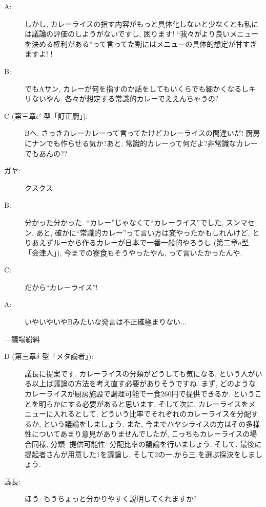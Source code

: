 \documentclass[10pt,b5jsbook,dvips,dvipdfmx,openany]{jsbook}
\theoremstyle{definition}
\begin{document}
\begin{multicols}{2}
\begin{description}
		\item[A: ]しかし, カレーライスの指す内容がもっと具体化しないと少なくとも私には議論の評価のしようがないですし, 困ります! ``我々がより良いメニューを決める権利がある''って言ってた割にはメニューの具体的想定が甘すぎますよ! ! 

		\item[B: ]でもAサン, カレーが何を指すのか話をしてもいくらでも細かくなるしキリないやん. 各々が想定する常識的カレーでええんちゃうの?

		\item[C (第三章$ \epsilon ' $  型「訂正厨」): ] Bへ. さっきカレーカレーって言ってたけどカレーライスの間違いだ! 厨房にナンでも作らせる気か?あと, 常識的カレーって何だよ?非常識なカレーでもあんの??

		\item[ガヤ: ] クスクス

		\item[B: ] 分かった分かった. ``カレー''じゃなくて``カレーライス''でした, スンマセン. あと, 確かに``常識的カレー''って言い方は変やったかもしれんけど, とりあえずルーから作るカレーが日本で一番一般的やろうし (第二章$a$型「会津人」), 今までの寮食もそうやったやん, って言いたかったんや. 

		\item[C: ]だから``カレーライス''! 
		\item[A: ]いやいやいやBみたいな発言は不正確極まりない...

		\end{description}

		---議場紛糾

		\begin{description}

		\item[D (第三章$ \delta $ 型「メタ論者」): ]議長に提案です. カレーライスの分類がどうしても気になる, という人がいる以上は議論の方法を考え直す必要がありそうですね. まず, どのようなカレーライスが厨房施設で調理可能で一食260円で提供できるか, ということを明らかにする必要があると思います. そして次に, カレーライスをメニューに入れるとして, どういう比率でそれぞれのカレーライスを分配するか, という議論をしましょう. また, 今までハヤシライスの方はその多様性についてあまり意見がありませんでしたが, こっちもカレーライスの場合同様, 分類$ \cdot $ 提供可能性$ \cdot $ 分配比率の議論を行いましょう. そして, 最後に提起者さんが用意した1を議論し, そして2の一.から三.を選ぶ採決をしましょう. 

		\item[議長: ]ほう. もうちょっと分かりやすく説明してくれますか?


\end{description}
\end{multicols}
\end{document}
